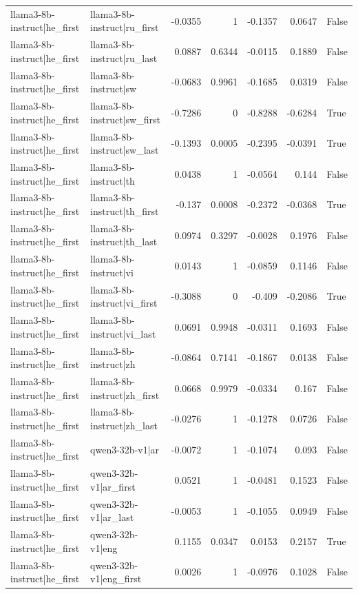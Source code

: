 \begin{table}
\begin{tabular}{l l r r r r l}
llama3-8b-instruct|he_first & llama3-8b-instruct|ru_first & -0.0355 & 1 & -0.1357 & 0.0647 & False \\
llama3-8b-instruct|he_first & llama3-8b-instruct|ru_last & 0.0887 & 0.6344 & -0.0115 & 0.1889 & False \\
llama3-8b-instruct|he_first & llama3-8b-instruct|sw & -0.0683 & 0.9961 & -0.1685 & 0.0319 & False \\
llama3-8b-instruct|he_first & llama3-8b-instruct|sw_first & -0.7286 & 0 & -0.8288 & -0.6284 & True \\
llama3-8b-instruct|he_first & llama3-8b-instruct|sw_last & -0.1393 & 0.0005 & -0.2395 & -0.0391 & True \\
llama3-8b-instruct|he_first & llama3-8b-instruct|th & 0.0438 & 1 & -0.0564 & 0.144 & False \\
llama3-8b-instruct|he_first & llama3-8b-instruct|th_first & -0.137 & 0.0008 & -0.2372 & -0.0368 & True \\
llama3-8b-instruct|he_first & llama3-8b-instruct|th_last & 0.0974 & 0.3297 & -0.0028 & 0.1976 & False \\
llama3-8b-instruct|he_first & llama3-8b-instruct|vi & 0.0143 & 1 & -0.0859 & 0.1146 & False \\
llama3-8b-instruct|he_first & llama3-8b-instruct|vi_first & -0.3088 & 0 & -0.409 & -0.2086 & True \\
llama3-8b-instruct|he_first & llama3-8b-instruct|vi_last & 0.0691 & 0.9948 & -0.0311 & 0.1693 & False \\
llama3-8b-instruct|he_first & llama3-8b-instruct|zh & -0.0864 & 0.7141 & -0.1867 & 0.0138 & False \\
llama3-8b-instruct|he_first & llama3-8b-instruct|zh_first & 0.0668 & 0.9979 & -0.0334 & 0.167 & False \\
llama3-8b-instruct|he_first & llama3-8b-instruct|zh_last & -0.0276 & 1 & -0.1278 & 0.0726 & False \\
llama3-8b-instruct|he_first & qwen3-32b-v1|ar & -0.0072 & 1 & -0.1074 & 0.093 & False \\
llama3-8b-instruct|he_first & qwen3-32b-v1|ar_first & 0.0521 & 1 & -0.0481 & 0.1523 & False \\
llama3-8b-instruct|he_first & qwen3-32b-v1|ar_last & -0.0053 & 1 & -0.1055 & 0.0949 & False \\
llama3-8b-instruct|he_first & qwen3-32b-v1|eng & 0.1155 & 0.0347 & 0.0153 & 0.2157 & True \\
llama3-8b-instruct|he_first & qwen3-32b-v1|eng_first & 0.0026 & 1 & -0.0976 & 0.1028 & False \\

\end{tabular}
\end{table}
